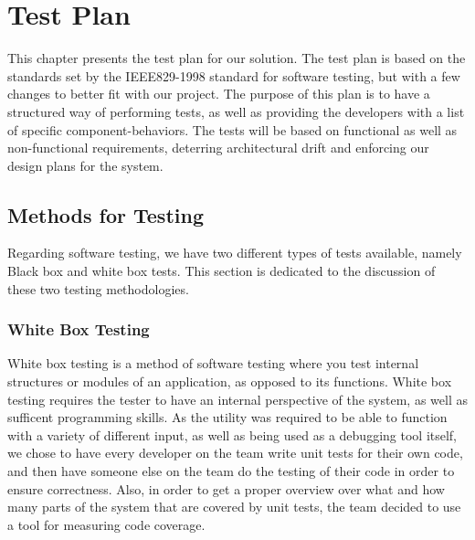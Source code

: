 \chapter{Test Plan}
This chapter presents the test plan for our solution. The test plan is based on
the standards set by the IEEE829-1998 standard for software testing\cite{IEEE829}, but with a
few changes to better fit with our project. The purpose of this plan is to have
a structured way of performing tests, as well as providing the developers with
a list of specific component-behaviors. The tests will be based on functional as
well as non-functional requirements, deterring architectural drift and
enforcing our design plans for the system.


\section{Methods for Testing}
Regarding software testing, we have two different types of tests available, namely Black box and white box tests. This section is dedicated to the discussion of these two testing methodologies.


\subsection{White Box Testing}
White box testing is a method of software testing where you test internal structures or modules of an application, as opposed to its functions. White box testing requires the tester to have an internal perspective of the system, as well as sufficent programming skills. As the \gls{utility} was required to be able to function with a variety of different input, as well as being used as a debugging tool itself, we chose to have every developer on the team write unit tests for their own code, and then have someone else on the team do the testing of their code in order to ensure correctness. Also, in order to get a proper overview over what and how many parts of the system that are covered by unit tests, the team decided to use a tool for measuring code coverage.

